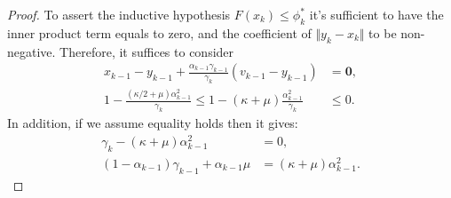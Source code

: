\documentclass[12pt]{article}
\begin{document}
\begin{proof}
{            }
            To assert the inductive hypothesis $F(x_k) \le \phi_k^*$ it's sufficient to have the inner product term equals to zero, and the coefficient of $\Vert y_k - x_k\Vert$ to be non-negative. 
            Therefore, it suffices to consider 
            \begin{align*}
                x_{k - 1} - y_{k - 1}
                + 
                \frac{\alpha_{k - 1}\gamma_{k - 1}}{\gamma_k}
                (v_{k - 1} - y_{k - 1}) 
                &= 
                \mathbf 0, 
                \\
                1 - \frac{(\kappa/2 + \mu)\alpha_{k - 1}^2}{\gamma_k}
                \le 
                1 - (\kappa + \mu)\frac{\alpha_{k - 1}^2}{\gamma_k} 
                & \le 0. 
            \end{align*}
            In addition, if we assume equality holds then it gives: 
            \begin{align*}
                \gamma_k - (\kappa + \mu)\alpha_{k - 1}^2 
                &= 0, 
                \\
                (1 - \alpha_{k - 1})\gamma_{k - 1} + \alpha_{k - 1}\mu 
                &= (\kappa + \mu)\alpha_{k - 1}^2. 
            \end{align*}
        \end{proof}
\end{document}
